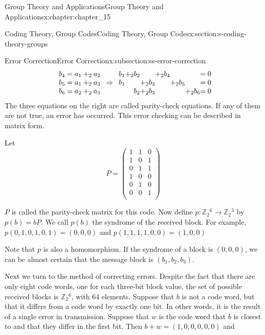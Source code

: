 \documentclass[twoside,10pt,]{book}
\numberwithin{equation}{section}
\begin{document}
\begin{chapterptx}{Group Theory and Applications}{}{Group Theory and Applications}{}{}{x:chapter:chapter_15}
\begin{sectionptx}{Coding Theory, Group Codes}{}{Coding Theory, Group Codes}{}{}{x:section:s-coding-theory-groups}
\begin{subsectionptx}{Error Correction}{}{Error Correction}{}{}{x:subsection:ss-error-correction}
\begin{equation*}
\begin{array}{c}
b_4=a_1+_2a_2 \\
b_5=a_1+_2a_3 \\
b_6=a_2+_2a_3 \\
\end{array}
\Rightarrow 
\begin{array}{r@{}r@{}r@{}r@{}r@{}r@{}r@{}r@{}r@{}r@{}r@{}r@{}}
b_1 & +_2 & b_2 &      &   &+_2& b_4&    &     &    &   &=0\\
b_1 &     &     & +_2  &b_3&   &    & +_2& b_5 &    &   &=0\\
&     & b_2 & +_2  &b_3&   &    &    &     &+_2 &b_6&=0\\
\end{array}
\end{equation*}
The three equations on the right are called parity-check equations. If any of them are not true, an error has occurred. This error checking can be described in matrix form.%
\par
Let%
\begin{equation*}
P=\left(
\begin{array}{ccc}
1 & 1 & 0 \\
1 & 0 & 1 \\
0 & 1 & 1 \\
1 & 0 & 0 \\
0 & 1 & 0 \\
0 & 0 & 1 \\
\end{array}
\right)
\end{equation*}
%
\par
\(P\) is called the parity-check matrix for this code. Now define \(p:\mathbb{Z}_2{}^6 \to \mathbb{Z}_2{}^3\) by \(p(b) = b P\).  We call \(p(b)\) the syndrome of the received block. For example, \(p(0,1,0,1,0,1)=(0,0,0)\)  and   \(p(1,1,1,1,0,0)=(1,0,0)\)%
\par
Note that \(p\) is also a homomorphism. If the syndrome of a block is \((0, 0, 0)\), we can be almost certain that the message block is \(\left(b_1, b_2, b_3\right)\).%
\par
Next we turn to the method of correcting errors. Despite the fact that there are only eight code words, one for each three-bit block value, the set of possible received blocks is \(\mathbb{Z}_2{}^6\), with 64 elements. Suppose that \(b\) is not a code word, but that it differs from a code word by exactly one bit. In other words, it is the result of a single error in transmission. Suppose that \(w\) is the code word that \(b\) is closest to and that they differ in the first bit. Then \(b + w = (1, 0, 0, 0, 0, 0)\) and%

\end{subsectionptx}
\end{sectionptx}
\end{chapterptx}
\end{document}
